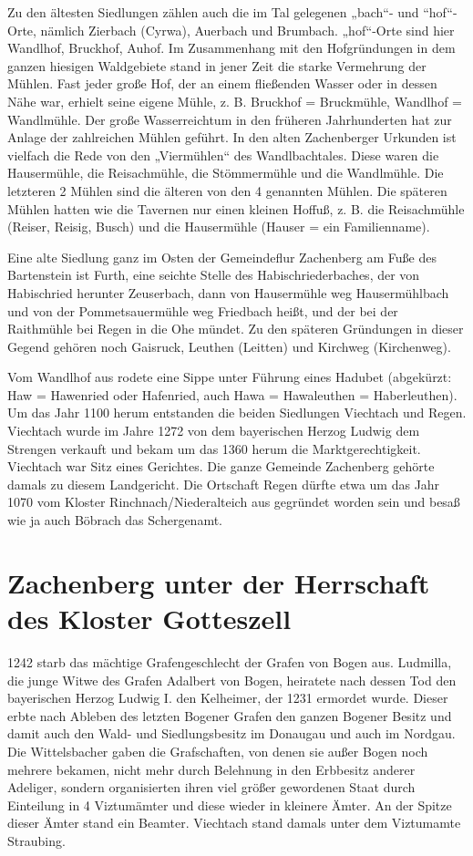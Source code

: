 \documentclass{book}
\begin{document}
Zu den ältesten Siedlungen zählen auch die im Tal gelegenen „bach“- und
“hof“-Orte, nämlich Zierbach (Cyrwa), Auerbach und Brumbach. „hof“-Orte
sind hier Wandlhof, Bruckhof, Auhof. Im Zusammenhang mit den
Hofgründungen in dem ganzen hiesigen Waldgebiete stand in jener Zeit die
starke Vermehrung der Mühlen. Fast jeder große Hof, der an einem
fließenden Wasser oder in dessen Nähe war, erhielt seine eigene Mühle,
z. B. Bruckhof = Bruckmühle, Wandlhof = Wandlmühle. Der große
Wasserreichtum in den früheren Jahrhunderten hat zur Anlage der
zahlreichen Mühlen geführt. In den alten Zachenberger Urkunden ist
vielfach die Rede von den „Viermühlen“ des Wandlbachtales. Diese waren
die Hausermühle, die Reisachmühle, die Stömmermühle und die Wandlmühle.
Die letzteren 2 Mühlen sind die älteren von den 4 genannten Mühlen. Die
späteren Mühlen hatten wie die Tavernen nur einen kleinen Hoffuß, z. B.
die Reisachmühle (Reiser, Reisig, Busch) und die Hausermühle (Hauser =
ein Familienname).

Eine alte Siedlung ganz im Osten der Gemeindeflur Zachenberg am Fuße des
Bartenstein ist Furth, eine seichte Stelle des Habischriederbaches, der
von Habischried herunter Zeuserbach, dann von Hausermühle weg
Hausermühlbach und von der Pommetsauermühle weg Friedbach heißt, und der
bei der Raithmühle bei Regen in die Ohe mündet. Zu den späteren
Gründungen in dieser Gegend gehören noch Gaisruck, Leuthen (Leitten) und
Kirchweg (Kirchenweg).

Vom Wandlhof aus rodete eine Sippe unter Führung eines Hadubet
(abgekürzt: Haw = Hawenried oder Hafenried, auch Hawa = Hawaleuthen =
Haberleuthen). Um das Jahr 1100 herum entstanden die beiden Siedlungen
Viechtach und Regen. Viechtach wurde im Jahre 1272 von dem bayerischen
Herzog Ludwig dem Strengen verkauft und bekam um das 1360 herum die
Marktgerechtigkeit. Viechtach war Sitz eines Gerichtes. Die ganze
Gemeinde Zachenberg gehörte damals zu diesem Landgericht. Die Ortschaft
Regen dürfte etwa um das Jahr 1070 vom Kloster Rinchnach/Niederalteich
aus gegründet worden sein und besaß wie ja auch Böbrach das Schergenamt.

\section{Zachenberg unter der Herrschaft des Kloster Gotteszell}

1242 starb das mächtige Grafengeschlecht der Grafen von Bogen aus.
Ludmilla, die junge Witwe des Grafen Adalbert von Bogen, heiratete nach
dessen Tod den bayerischen Herzog Ludwig I. den Kelheimer, der 1231
ermordet wurde. Dieser erbte nach Ableben des letzten Bogener Grafen den
ganzen Bogener Besitz und damit auch den Wald- und Siedlungsbesitz im
Donaugau und auch im Nordgau. Die Wittelsbacher gaben die Grafschaften,
von denen sie außer Bogen noch mehrere bekamen, nicht mehr durch
Belehnung in den Erbbesitz anderer Adeliger, sondern organisierten ihren
viel größer gewordenen Staat durch Einteilung in 4 Viztumämter und diese
wieder in kleinere Ämter. An der Spitze dieser Ämter stand ein Beamter.
Viechtach stand damals unter dem Viztumamte Straubing.
\end{document}
